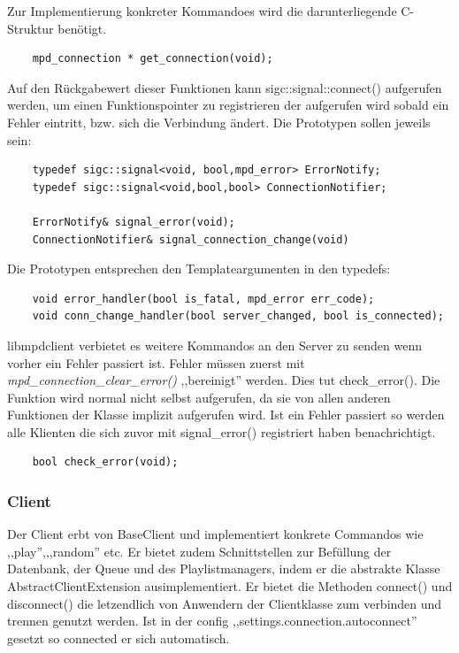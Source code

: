 Zur Implementierung konkreter Kommandoes wird die darunterliegende C-Struktur benötigt.
\begin{verbatim}
    mpd_connection * get_connection(void);
\end{verbatim}

Auf den Rückgabewert dieser Funktionen kann sigc::signal::connect() aufgerufen werden, 
um einen Funktionspointer zu registrieren der aufgerufen wird sobald ein Fehler eintritt,
bzw. sich die Verbindung ändert. Die Prototypen sollen jeweils sein:
\begin{verbatim}
    typedef sigc::signal<void, bool,mpd_error> ErrorNotify;
    typedef sigc::signal<void,bool,bool> ConnectionNotifier;
    
    ErrorNotify& signal_error(void);
    ConnectionNotifier& signal_connection_change(void)
\end{verbatim}

Die Prototypen entsprechen den Templateargumenten in den typedefs:
\begin{verbatim}
    void error_handler(bool is_fatal, mpd_error err_code);
    void conn_change_handler(bool server_changed, bool is_connected); 
\end{verbatim} 

libmpdclient verbietet es weitere Kommandos an den Server zu senden wenn vorher ein Fehler passiert ist.
Fehler müssen zuerst mit \emph{mpd\_connection\_clear\_error()} ,,bereinigt'' werden. 
Dies tut check\_error(). Die Funktion wird normal nicht selbst aufgerufen, da sie von allen anderen Funktionen der Klasse
implizit aufgerufen wird. Ist ein Fehler passiert so werden alle Klienten die sich zuvor
mit signal\_error() registriert haben benachrichtigt. 
\begin{verbatim}
    bool check_error(void);
\end{verbatim}


\subsubsection{Client}
Der Client erbt von BaseClient und implementiert konkrete Commandos wie ,,play'',,,random'' etc.
Er bietet zudem Schnittstellen zur Befüllung der Datenbank, der Queue und des Playlistmanagers, indem 
er die abstrakte Klasse AbstractClientExtension ausimplementiert.
Er bietet die Methoden connect() und disconnect() die letzendlich von Anwendern der Clientklasse zum verbinden und trennen genutzt werden. 
Ist in der config ,,settings.connection.autoconnect'' gesetzt so connected er sich automatisch.

